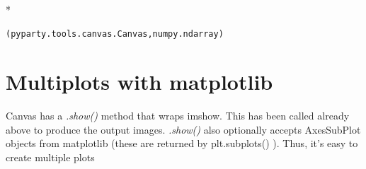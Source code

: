 \documentclass[letterpaper,10pt,english]{/usr/local/EPD7.3/lib/python2.7/site-packages/sphinx/texinputs/sphinxhowto}
\def\smaller{\fontsize{9.5pt}{9.5pt}\selectfont}
\newenvironment{InvisibleVerbatim}
{\begin{mdframed}[leftmargin=0.1\linewidth,innerleftmargin=3pt,innerrightmargin=3pt, userdefinedwidth=1\linewidth, linewidth=0pt, linecolor=white, usetwoside=false]}
{\end{mdframed}}
\begin{document}




\makebox[0.1\linewidth]{\smaller\hfill\tt\color{nbframe-out-prompt}Out\hspace{4pt}{[}29{]}:\hspace{4pt}}\\*
\vspace{-2.55\baselineskip}\begin{InvisibleVerbatim}
\vspace{-0.5\baselineskip}
\begin{alltt}(pyparty.tools.canvas.Canvas, numpy.ndarray)\end{alltt}

\end{InvisibleVerbatim}



\section{Multiplots with matplotlib
}Canvas has a \emph{.show()} method that wraps imshow. This has been
called already above to produce the output images. \emph{.show()}
also optionally accepts AxesSubPlot objects from matplotlib (these
are returned by plt.subplots() ). Thus, it's easy to create
multiple plots


\end{document}
